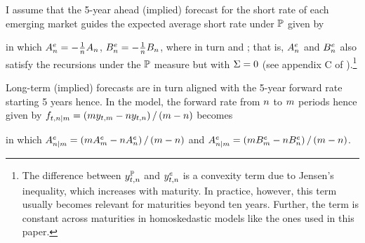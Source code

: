 {I assume that the 5-year ahead (implied) forecast for the short rate of each emerging market guides %
the expected average short rate under \(\mathbb{P}\) given by

\noindent in which \(A_{n}^{e} = - \frac{1}{n} A_{n}\), \(B_{n}^{e} = - \frac{1}{n} B_{n}\), where in turn \!and \!\!; that is, \(A_{n}^{e}\) and \(B_{n}^{e}\) also satisfy the recursions under the \(\mathbb{P}\) measure but with \(\Sigma = 0\) (see appendix C of \cite{Guimaraes:2014}).\footnote{ The difference between \(y_{t,n}^{\mathbb{P}}\) and \(y_{t,n}^{e}\) is a convexity term due to Jensen's inequality, which increases with maturity. In practice, however, this term usually becomes relevant for maturities beyond ten years. Further, the term is constant across maturities in homoskedastic models like the ones used in this paper.}

Long-term (implied) forecasts 
are in turn aligned with the 5-year forward rate starting 5 years hence.
In the model, the forward rate from \(n\) to \(m\) periods hence
given by \(f_{t,n | m} = \left( m y_{t,m} - n y_{t,n} \right)/ \left( m - n \right)\) becomes

\noindent in which \(A_{n | m}^{e} = \left( m A_{m}^{e} - n A_{n}^{e} \right)/ \left( m - n \right)\)  and \(A_{n | m}^{e} = \left( m B_{m}^{e} - n B_{n}^{e} \right)/ \left( m - n \right)\).


%	
%	
%	


}
